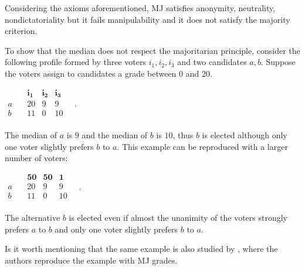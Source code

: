 	Considering the axioms aforementioned, \ac{MJ} satisfies anonymity, neutrality, nondictatoriality but it fails manipulability and it does not satisfy the majority criterion. 
	\begin{example}
		\label{ex:MJfailsMajority}
		To show that the median does not respect the majoritarian principle, consider the following profile formed by three voters $i_1, i_2, i_3$ and two candidates $a, b$. Suppose the voters assign to candidates a grade between 0 and 20.
		\begin{center}
			$
			\begin{array}{cccc}
				&\mathbf{i_1} & \mathbf{i_2} & \mathbf{i_3} \\
				a \quad &20&9&9\\
				b \quad &11&0&10\\
			\end{array}\quad .
			$
		\end{center}
		The median of $a$ is $9$ and the median of $b$ is $10$, thus $b$ is elected although only one voter slightly prefers $b$ to $a$. This example can be reproduced with a larger number of voters:
		\begin{center}
			$
			\begin{array}{cccc}
				&\mathbf{50} & \mathbf{50} & \mathbf{1} \\
				a \quad &20&9&9\\
				b \quad &11&0&10\\
			\end{array}\quad .
			$
		\end{center}
		The alternative $b$ is elected even if almost the unanimity of the voters strongly prefers $a$ to $b$ and only one voter slightly prefers $b$ to $a$.
	\end{example}

	Is it worth mentioning that the same example is also studied by \citet[p. 281]{Balinski2011}, where the authors reproduce the example with \ac{MJ} grades. 
	
